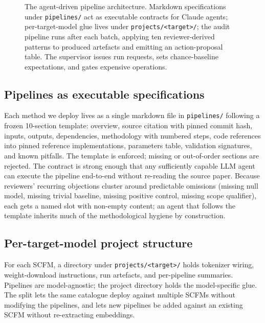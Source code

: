 \documentclass{article}
\newcommand{\scfm}{SCFM\xspace}
\begin{document}
\begin{figure}[t]
\caption{The agent-driven pipeline architecture. Markdown
specifications under \texttt{pipelines/} act as executable
contracts for Claude agents; per-target-model glue lives under
\texttt{projects/<target>/}; the audit pipeline runs after each
batch, applying ten reviewer-derived patterns to produced
artefacts and emitting an action-proposal table. The supervisor
issues run requests, sets chance-baseline expectations, and gates
expensive operations.}
\label{fig:architecture}
\end{figure}

\subsection{Pipelines as executable specifications}
Each method we deploy lives as a single markdown file in
\texttt{pipelines/} following a frozen 10-section template:
overview, source citation with pinned commit hash, inputs, outputs,
dependencies, methodology with numbered steps, code references
into pinned reference implementations, parameters table,
validation signatures, and known pitfalls. The template is
enforced; missing or out-of-order sections are rejected. The
contract is strong enough that any sufficiently capable LLM agent
can execute the pipeline end-to-end without re-reading the source
paper. Because reviewers' recurring objections cluster around
predictable omissions (missing null model, missing trivial
baseline, missing positive control, missing scope qualifier), each
gets a named slot with non-empty content; an agent that follows
the template inherits much of the methodological hygiene by
construction.

\subsection{Per-target-model project structure}
For each \scfm{}, a directory under \texttt{projects/<target>/}
holds tokenizer wiring, weight-download instructions, run
artefacts, and per-pipeline summaries. Pipelines are
model-agnostic; the project directory holds the model-specific
glue. The split lets the same catalogue deploy against multiple
\scfm{}s without modifying the pipelines, and lets new pipelines
be added against an existing \scfm{} without re-extracting
embeddings.
\end{document}
